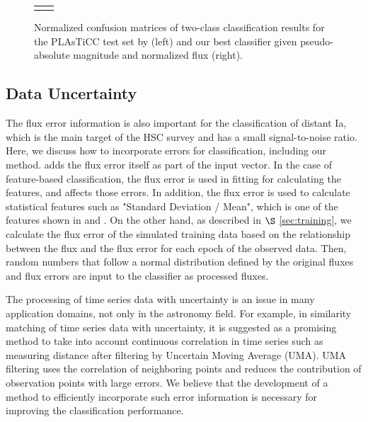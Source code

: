 \documentclass[useamsfonts]{pasj01}
\begin{document}
\begin{figure}[htbp]
\begin{tabular}{cc}
\begin{minipage}{0.5\hsize}
\begin{center}
            \end{center}
        \end{minipage}
    \end{tabular}  \caption{%
    Normalized confusion matrices of two-class classification results for the PLAsTiCC test set by \citet{boone19a} (left) and our best classifier given pseudo-absolute magnitude and normalized flux (right).
    }%
    \label{fig:comp_plasticc_1st}
\end{figure}
%
%
%
%
\subsection{Data Uncertainty}
%
The flux error information is also important for the classification of distant Ia, which is the main target of the HSC survey and has a small signal-to-noise ratio.
Here, we discuss how to incorporate errors for classification, including our method.
\citet{charnock17a} adds the flux error itself as part of the input vector.
In the case of feature-based classification, the flux error is used in fitting for calculating the features, and affects those errors.
In addition, the flux error is used to calculate statistical features such as "Standard Deviation / Mean", which is one of the features shown in \citet{narayan18a} and \citet{Muthukrishna_2019}.
On the other hand, as described in $\S$ \ref{sec:training}, we calculate the flux error of the simulated training data based on the relationship between the flux and the flux error for each epoch of the observed data.
Then, random numbers that follow a normal distribution defined by the original fluxes and flux errors are input to the classifier as processed fluxes.

The processing of time series data with uncertainty is an issue in many application domains, not only in the astronomy field.
For example, in similarity matching of time series data with uncertainty, it is suggested as a promising method to take into account continuous correlation in time series such as measuring distance after filtering by Uncertain Moving Average (UMA)\citep{Dallachiesa_2012}.
UMA filtering uses the correlation of neighboring points and reduces the contribution of observation points with large errors.
We believe that the development of a method to efficiently incorporate such error information is necessary for improving the classification performance.
%
\end{document}
